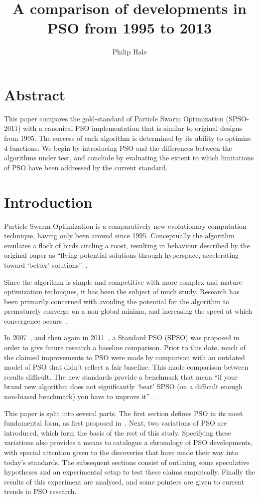 \documentclass{csfourzero}
\author{Philip Hale}
\title{A comparison of developments in PSO from 1995 to 2013}
\begin{document}
\maketitle

\section{Abstract}

This paper compares the gold-standard of Particle Swarm Optimization
(SPSO-2011) with a canonical PSO implementation that is similar to original
designs from 1995. The success of each algorithm is determined by its ability
to optimize 4 functions. We begin by introducing PSO and the differences
between the algorithms under test, and conclude by evaluating the extent to
which limitations of PSO have been addressed by the current standard.

\section{Introduction}

Particle Swarm Optimization is a comparatively new evolutionary computation
technique, having only been around since 1995.  Conceptually the algorithm
emulates a flock of birds circling a roost, resulting in  behaviour described
by the original paper as ``flying potential solutions through hyperspace,
accelerating toward `better' solutions''~\cite{Kennedy:1995bi}.

Since the algorithm is simple and competitive with more complex and mature
optimization techniques, it has been the subject of much study. Research has
been primarily concerned with avoiding the potential for the algorithm to
prematurely converge on a non-global minima, and increasing the speed at which
convergence occurs~\cite{vandenBergh:2002tk}.

In 2007~\cite{Bratton:2007hq}, and then again in 2011~\cite{Clerc:2012to}, a
Standard PSO (SPSO) was proposed in order to give future research a baseline
comparison. Prior to this date, much of the claimed improvements to PSO were
made by comparison with an outdated model of PSO that didn't reflect a fair
baseline. This made comparison between results difficult. The new standards
provide a benchmark that mean  ``if your brand new algorithm does not
significantly `beat' SPSO (on a difficult enough non-biased benchmark) you have
to improve it''~\cite{Clerc:2012to}.

This paper is split into several parts. The first section defines PSO in its
most fundamental form, as first proposed in~\cite{Kennedy:1995bi}. Next, two
variations of PSO are introduced, which form the basis of the rest of this
study. Specifying these variations also provides a means to catalogue a
chronology of PSO developments, with special attention given to the discoveries
that have made their way into today's standards. The subsequent sections consist
of outlining some speculative hypotheses and an experimental setup to test these
claims empirically. Finally the results of this experiment are analysed, and
some pointers are given to current trends in PSO research.
\end{document}
